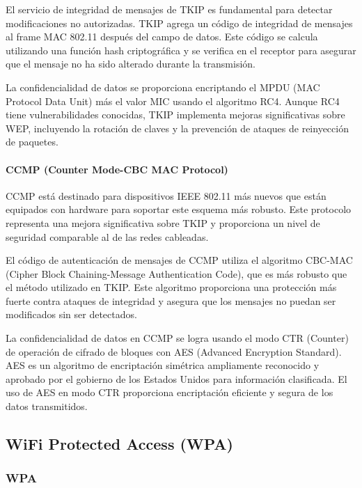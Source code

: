 El servicio de integridad de mensajes de TKIP es fundamental para detectar modificaciones no autorizadas. TKIP agrega un código de integridad de mensajes al frame MAC 802.11 después del campo de datos. Este código se calcula utilizando una función hash criptográfica y se verifica en el receptor para asegurar que el mensaje no ha sido alterado durante la transmisión.

La confidencialidad de datos se proporciona encriptando el MPDU (MAC Protocol Data Unit) más el valor MIC usando el algoritmo RC4. Aunque RC4 tiene vulnerabilidades conocidas, TKIP implementa mejoras significativas sobre WEP, incluyendo la rotación de claves y la prevención de ataques de reinyección de paquetes.

\paragraph{CCMP (Counter Mode-CBC MAC Protocol)}

CCMP está destinado para dispositivos IEEE 802.11 más nuevos que están equipados con hardware para soportar este esquema más robusto. Este protocolo representa una mejora significativa sobre TKIP y proporciona un nivel de seguridad comparable al de las redes cableadas.

El código de autenticación de mensajes de CCMP utiliza el algoritmo CBC-MAC (Cipher Block Chaining-Message Authentication Code), que es más robusto que el método utilizado en TKIP. Este algoritmo proporciona una protección más fuerte contra ataques de integridad y asegura que los mensajes no puedan ser modificados sin ser detectados.

La confidencialidad de datos en CCMP se logra usando el modo CTR (Counter) de operación de cifrado de bloques con AES (Advanced Encryption Standard). AES es un algoritmo de encriptación simétrica ampliamente reconocido y aprobado por el gobierno de los Estados Unidos para información clasificada. El uso de AES en modo CTR proporciona encriptación eficiente y segura de los datos transmitidos.

\subsection{WiFi Protected Access (WPA)}

\subsubsection{WPA}


